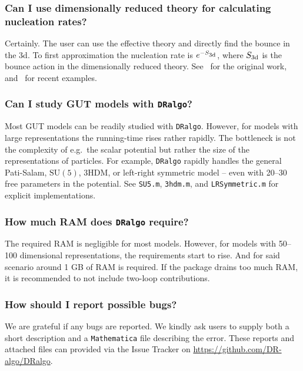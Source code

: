 \documentclass[11pt]{article}
\def\dralgo{{\tt DRalgo}}
\renewcommand{\rmi}[1]{{\mbox{\scriptsize #1}}}
\begin{document}
%
\subsubsection{Can I use dimensionally reduced theory for calculating nucleation rates?}
Certainly.
The user can use the effective theory and directly find
the bounce in the 3d. To first approximation the nucleation rate is
$e^{-S_\rmi{3d}}$, where
$S_\rmi{3d}$ is the bounce action in the dimensionally reduced theory.
See~\cite{Linde:1981zj} for the original work,
and~\cite{%
  Gould:2021ccf,Ekstedt:2021kyx,Hirvonen:2021zej,Ekstedt:2022tqk}
for recent examples.

%
\subsubsection{Can I study GUT models with \dralgo{}?}
Most GUT models can be readily studied with \dralgo{}.
However, for models with large representations the running-time rises rather rapidly.
The bottleneck is not the complexity of e.g.\ the scalar potential but rather
the size of the representations of particles.
For example, \dralgo{} rapidly handles the general
Pati-Salam,
$\mathrm{SU}(5)$,
3HDM, or
left-right symmetric model --
even with 20--30 free parameters in the potential.
See
{\tt{SU5.m}},
{\tt{3hdm.m}}, and
{\tt{LRSymmetric.m}} 
for explicit implementations.

%
\subsubsection{How much RAM does \dralgo{} require?}

The required RAM is negligible for most models.
However, for models with 50--100 dimensional representations,
the requirements start to rise.
And for said scenario around 1 GB of RAM is required.
If the package drains too much RAM, it is recommended to not include
two-loop contributions.

%
\subsubsection{How should I report possible bugs?}
We are grateful if any bugs are reported.
We kindly ask users to supply both a short description and
a {\tt Mathematica} file describing the error.
These reports and attached files can provided via the Issue Tracker on 
\url{https://github.com/DR-algo/DRalgo}. 
\end{document}
